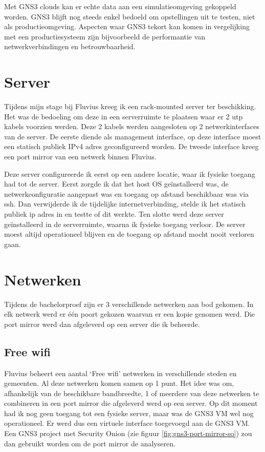 \documentclass[a4paper,12pt]{report}
\begin{document}
Met GNS3 clouds kan er echte data aan een simulatieomgeving gekoppeld worden.
GNS3 blijft nog steeds enkel bedoeld om opstellingen uit te testen, niet als productieomgeving.
Aspecten waar GNS3 tekort kan komen in vergelijking met een productiesysteem zijn bijvoorbeeld de performantie van netwerkverbindingen en betrouwbaarheid.

\section{Server}
\label{sec:server}
Tijdens mijn stage bij Fluvius kreeg ik een rack-mounted server ter beschikking.
Het was de bedoeling om deze in een serverruimte te plaatsen waar er 2 utp kabels voorzien werden.
Deze 2 kabels werden aangesloten op 2 netwerkinterfaces van de server.
De eerste diende als management interface, op deze interface moest een statisch publiek IPv4 adres geconfigureerd worden.
De tweede interface kreeg een port mirror van een netwerk binnen Fluvius.

Deze server configureerde ik eerst op een andere locatie, waar ik fysieke toegang had tot de server.
Eerst zorgde ik dat het host OS geïnstalleerd was, de netwerkconfiguratie aangepast was en toegang op afstand beschikbaar was via ssh.
Dan verwijderde ik de tijdelijke internetverbinding, stelde ik het statisch publiek ip adres in en testte of dit werkte.
Ten slotte werd deze server geïnstalleerd in de serverruimte, waarna ik fysieke toegang verloor.
De server moest altijd operationeel blijven en de toegang op afstand mocht nooit verloren gaan.

\section{Netwerken}
Tijdens de bachelorproef zijn er 3 verschillende netwerken aan bod gekomen.
In elk netwerk werd er één poort gekozen waarvan er een kopie genomen werd.
Die port mirror werd dan afgeleverd op een server die ik beheerde.

\subsection{Free wifi}
Fluvius beheert een aantal `Free wifi' netwerken in verschillende steden en gemeenten.
Al deze netwerken komen samen op 1 punt.
Het idee was om, afhankelijk van de beschikbare bandbreedte, 1 of meerdere van deze netwerken te combineren in een port mirror die afgeleverd werd op een server.
Op dit moment had ik nog geen toegang tot een fysieke server, maar was de GNS3 VM wel nog operationeel.
Er werd dus een virtuele interface toegevoegd aan de GNS3 VM.
Een GNS3 project met Security Onion (zie figuur \ref{fig:gns3-port-mirror-so}) zou dan gebruikt worden om de port mirror de analyseren.
\end{document}
